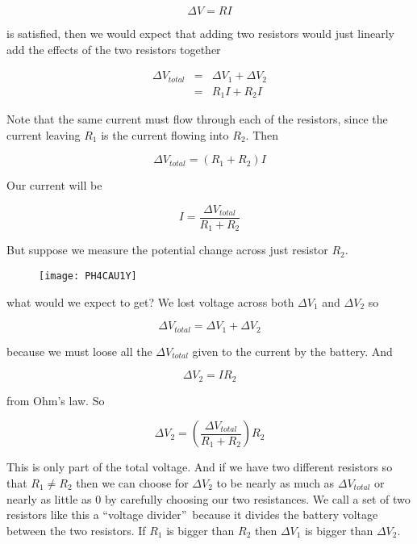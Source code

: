 \begin{equation*}
	\Delta V=RI
\end{equation*}

is satisfied, then we would expect that adding two resistors would just linearly add the effects of the two resistors together

\begin{eqnarray*}
	\Delta V_{total} &=&\Delta V_{1}+\Delta V_{2} \\
	&=&R_{1}I+R_{2}I
\end{eqnarray*}

Note that the same current must flow through each of the resistors, since the current leaving $R_{1}$ is the current flowing into $R_{2}.$ Then 

\begin{equation*}
	\Delta V_{total}=\left( R_{1}+R_{2}\right) I
\end{equation*}

Our current will be 

\begin{equation*}
	I=\frac{\Delta V_{total}}{R_{1}+R_{2}}
\end{equation*}

But suppose we measure the potential change across just resistor $R_{2}.$ 

\begin{figure}[h!]
	\centering
	\texttt{[image: PH4CAU1Y]}
\end{figure}

what would we expect to get? We lost voltage across both $\Delta V_{1}$ and $\Delta V_{2}$ so 

\begin{equation*}
	\Delta V_{total}=\Delta V_{1}+\Delta V_{2}
\end{equation*}

because we must loose all the $\Delta V_{total}$ given to the current by the
battery. And 

\begin{equation*}
	\Delta V_{2}=IR_{2}
\end{equation*}

from Ohm's law. So

\begin{equation*}
	\Delta V_{2}=\left( \frac{\Delta V_{total}}{R_{1}+R_{2}}\right) R_{2}
\end{equation*}

This is only part of the total voltage. And if we have two different
resistors so that $R_{1}\neq R_{2}$ then we can choose for $\Delta V_{2}$ to
be nearly as much as $\Delta V_{total}$ or nearly as little as $0$ by
carefully choosing our two resistances. We call a set of two resistors like
this a \textquotedblleft voltage divider\textquotedblright\ because it
divides the battery voltage between the two resistors. If $R_{1}$ is bigger
than $R_{2}$ then $\Delta V_{1}$ is bigger than $\Delta V_{2}.$

